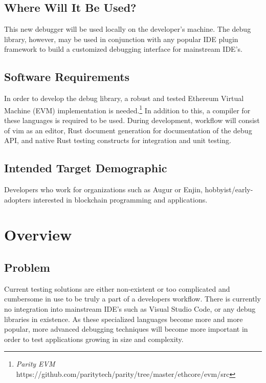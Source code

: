 \documentclass[]{article}
\begin{document}
\subsection{Where Will It Be Used?}
 
This new debugger will be used locally on the developer's machine. The debug library, however, may be used in conjunction with any popular IDE plugin framework to build a customized debugging interface for mainstream IDE's. 

\subsection{Software Requirements}
In order to develop the debug library, a robust and tested Ethereum Virtual Machine (EVM) implementation is needed.\footnote{\textit{Parity EVM} https://github.com/paritytech/parity/tree/master/ethcore/evm/src} In addition to this, a compiler for these languages is required to be used. During development, workflow will consist of vim as an editor, Rust document generation for documentation of the debug API, and native Rust testing constructs for integration and unit testing.

\subsection{Intended Target Demographic}
Developers who work for organizations such as Augur or Enjin, hobbyist/early-adopters interested in blockchain programming and applications.

\section{Overview}

\subsection{Problem}
Current testing solutions are either non-existent or too complicated and cumbersome in use to be truly a part of a developers workflow. There is currently no integration into mainstream IDE's such as Visual Studio Code, or any debug libraries in existence. As these specialized languages become more and more popular, more advanced debugging techniques will become more important in order to test applications growing in size and complexity. 
\end{document}

